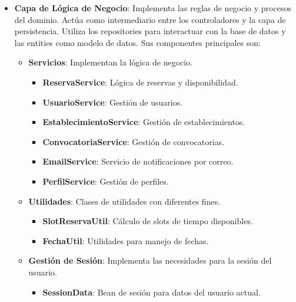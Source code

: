 \begin{itemize}
\begin{itemize}
         \end{itemize}

	\item \textbf{Capa de Lógica de Negocio}: Implementa las reglas de negocio y procesos del dominio. Actúa como intermediario entre los controladores y la capa de persistencia. Utiliza los repositories para interactuar con la base de datos y las entities como modelo de datos. Sus componentes principales son:
    	\begin{itemize}
            \item \textbf{Servicios}: Implementan la lógica de negocio.
        	\begin{itemize}
                \item \textbf{ReservaService}: Lógica de reservas y disponibilidad.
                \item \textbf{UsuarioService}: Gestión de usuarios.
                \item \textbf{EstablecimientoService}: Gestión de establecimientos.
                \item \textbf{ConvocatoriaService}: Gestión de convocatorias.
                \item \textbf{EmailService}: Servicio de notificaciones por correo.
                \item \textbf{PerfilService}: Gestión de perfiles.
             \end{itemize}

            \item \textbf{Utilidades}: Clases de utilidades con diferentes fines.
        	\begin{itemize}
                \item \textbf{SlotReservaUtil}: Cálculo de slots de tiempo disponibles.
                \item \textbf{FechaUtil}: Utilidades para manejo de fechas.
             \end{itemize}

            \item \textbf{Gestión de Sesión}: Implementa las necesidades para la sesión del usuario.
        	\begin{itemize}
                \item \textbf{SessionData}: Bean de sesión para datos del usuario actual.
             \end{itemize}
         \end{itemize}


\end{itemize}
